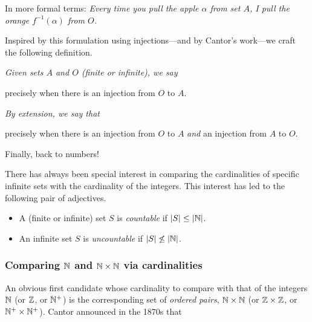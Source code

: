 \noindent
In more formal terms: {\em Every time you pull the apple $\alpha$ from set $A$, I pull the orange $f^{-1}(\alpha)$ from $O$.}

\medskip

Inspired by this formulation using injections---and by Cantor's work---we craft the following definition.

\bigskip

\noindent
{\em
Given sets $A$ and $O$ (finite or infinite), we say \\
\hspace*{.35in}{\em Set $O$ is at least as big as set $A$, denoted $|O| \geq |A|$}

\noindent
precisely when there is an injection from $O$ to $A$.}

\medskip

\noindent
{\em By extension, we say that \\
\hspace*{.35in}{\em Sets $O$ and $A$ have the same cardinality, denoted $|O| = |A|$}

\noindent
precisely when there is an injection from $O$ to $A$ {\em and} an injection from $A$ to $O$.}

\bigskip

Finally, back to numbers!

\smallskip

There has always been special interest in comparing the cardinalities of specific infinite sets with the cardinality of the integers.  This interest has led to the following pair of adjectives.

  
 
\begin{itemize}
\item
A (finite or infinite) set $S$ is {\it countable} if $|S| \leq |\mathbb{N}|$.

\item
An infinite set $S$ is {\it uncountable} if $|S| \not\leq |\mathbb{N}|$.
\end{itemize}

\subsubsection{Comparing $\mathbb{N}$ and $\mathbb{N} \times \mathbb{N}$ via cardinalities}
\label{sec:compare-NxN-N-via-card}

An obvious first candidate whose cardinality to compare with that of the integers $\mathbb{N}$ (or $\mathbb{Z}$, or $\mathbb{N}^+$) is the corresponding set of {\em ordered pairs}, $\mathbb{N} \times \mathbb{N}$ (or $\mathbb{Z} \times \mathbb{Z}$, or $\mathbb{N}^+ \times \mathbb{N}^+$).  Cantor announced in the 1870s that \\
\hspace*{.35in}{\em Pairing does not increase cardinality in infinite sets.}

